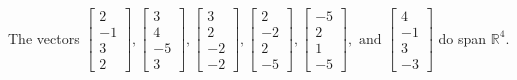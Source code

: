 \begin{exercise}
\begin{exerciseStatement}
  \end{exerciseStatement}
  \begin{exerciseAnswer}
   The vectors \(\left[\begin{array}{r}
2 \\
-1 \\
3 \\
2
\end{array}\right] , \left[\begin{array}{r}
3 \\
4 \\
-5 \\
3
\end{array}\right] , \left[\begin{array}{r}
3 \\
2 \\
-2 \\
-2
\end{array}\right] , \left[\begin{array}{r}
2 \\
-2 \\
2 \\
-5
\end{array}\right] , \left[\begin{array}{r}
-5 \\
2 \\
1 \\
-5
\end{array}\right] , \text{ and } \left[\begin{array}{r}
4 \\
-1 \\
3 \\
-3
\end{array}\right]\) 
  	 do  
	span \(\mathbb{R}^4\).
  


  \end{exerciseAnswer}
\end{exercise}